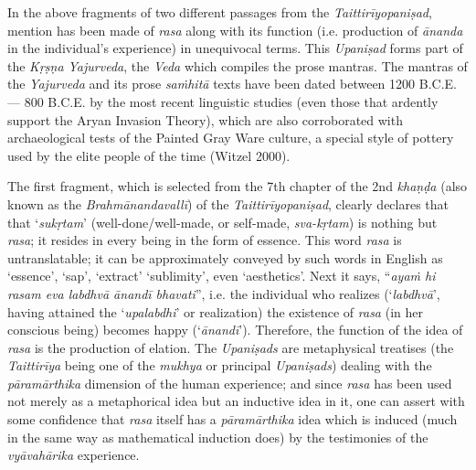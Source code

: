 In the above fragments of two different passages from the \textsl{Taittirīyopaniṣad}, mention has been made of \textsl{rasa} along with its function (i.e. production of \textsl{ānanda} in the individual’s experience) in unequivocal terms. This \textsl{Upaniṣad} forms part of the \textsl{Kṛṣṇa Yajurveda}, the \textsl{Veda} which compiles the prose mantras. The mantras of the \textsl{Yajurveda} and its prose \textsl{saṁhitā} texts have been dated between 1200 B.C.E. --- 800 B.C.E. by the most recent linguistic studies (even those that ardently support the Aryan Invasion Theory), which are also corroborated with archaeological tests of the Painted Gray Ware culture, a special style of pottery used by the elite people of the time (Witzel 2000). 

The first fragment, which is selected from the 7th chapter of the 2nd \textsl{khaṇḍa} (also known as the \textsl{Brahmānandavallī}) of the \textsl{Taittirīyopaniṣad},
 clearly declares that that ‘\textsl{sukṛtam}’ (well-done/well-made, or self-made, \textsl{sva-kṛtam}) is nothing but \textsl{rasa}; it resides in every being in the form of essence. This word \textsl{rasa} is untranslatable; it can be approximately conveyed by such words in English as ‘essence’, ‘sap’, ‘extract’ ‘sublimity’, even ‘aesthetics’. Next it says, “\textsl{ayaṁ hi rasam eva labdhvā ānandī bhavati}”, i.e. the individual who realizes (‘\textsl{labdhvā}’, having attained the ‘\textsl{upalabdhi}’ or realization) the existence of \textsl{rasa} (in her conscious being) becomes happy (‘\textsl{ānandī}’). Therefore, the function of the idea of \textsl{rasa} is the production of elation. The \textsl{Upaniṣads} are metaphysical treatises (the \textsl{Taittirīya} being one of the \textsl{mukhya} or principal \textsl{Upaniṣads}) dealing with the \textsl{pāramārthika} dimension of the human experience; and since \textsl{rasa} has been used not merely as a metaphorical idea but an inductive idea in it, one can assert with some confidence that \textsl{rasa} itself has a \textsl{pāramārthika} idea which is induced (much in the same way as mathematical induction does) by the testimonies of the \textsl{vyāvahārika} experience. 

